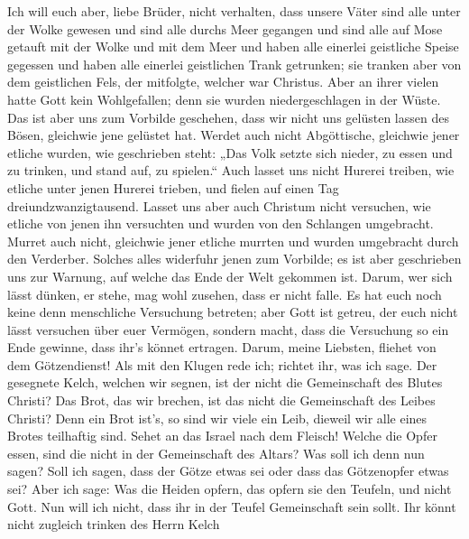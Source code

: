  Ich will euch aber, liebe Brüder, nicht verhalten, dass
unsere Väter sind alle unter der Wolke gewesen und sind alle durchs Meer
gegangen  und sind alle auf Mose getauft mit der Wolke und
mit dem Meer  und haben alle einerlei geistliche Speise
gegessen  und haben alle einerlei geistlichen Trank
getrunken; sie tranken aber von dem geistlichen Fels, der mitfolgte,
welcher war Christus.  Aber an ihrer vielen hatte Gott
kein Wohlgefallen; denn sie wurden niedergeschlagen in der Wüste.
 Das ist aber uns zum Vorbilde geschehen, dass wir nicht
uns gelüsten lassen des Bösen, gleichwie jene gelüstet hat.
 Werdet auch nicht Abgöttische, gleichwie jener etliche
wurden, wie geschrieben steht: „Das Volk setzte sich nieder, zu essen
und zu trinken, und stand auf, zu spielen.``  Auch lasset
uns nicht Hurerei treiben, wie etliche unter jenen Hurerei trieben, und
fielen auf einen Tag dreiundzwanzigtausend.  Lasset uns
aber auch Christum nicht versuchen, wie etliche von jenen ihn versuchten
und wurden von den Schlangen umgebracht.  Murret auch
nicht, gleichwie jener etliche murrten und wurden umgebracht durch den
Verderber.  Solches alles widerfuhr jenen zum Vorbilde;
es ist aber geschrieben uns zur Warnung, auf welche das Ende der Welt
gekommen ist.  Darum, wer sich lässt dünken, er stehe,
mag wohl zusehen, dass er nicht falle.  Es hat euch noch
keine denn menschliche Versuchung betreten; aber Gott ist getreu, der
euch nicht lässt versuchen über euer Vermögen, sondern macht, dass die
Versuchung so ein Ende gewinne, dass ihr's könnet ertragen.
 Darum, meine Liebsten, fliehet von dem Götzendienst!
 Als mit den Klugen rede ich; richtet ihr, was ich sage.
 Der gesegnete Kelch, welchen wir segnen, ist der nicht
die Gemeinschaft des Blutes Christi? Das Brot, das wir brechen, ist das
nicht die Gemeinschaft des Leibes Christi?  Denn ein Brot
ist's, so sind wir viele ein Leib, dieweil wir alle eines Brotes
teilhaftig sind.  Sehet an das Israel nach dem Fleisch!
Welche die Opfer essen, sind die nicht in der Gemeinschaft des Altars?
 Was soll ich denn nun sagen? Soll ich sagen, dass der
Götze etwas sei oder dass das Götzenopfer etwas sei? 
Aber ich sage: Was die Heiden opfern, das opfern sie den Teufeln, und
nicht Gott. Nun will ich nicht, dass ihr in der Teufel Gemeinschaft sein
sollt.  Ihr könnt nicht zugleich trinken des Herrn Kelch
